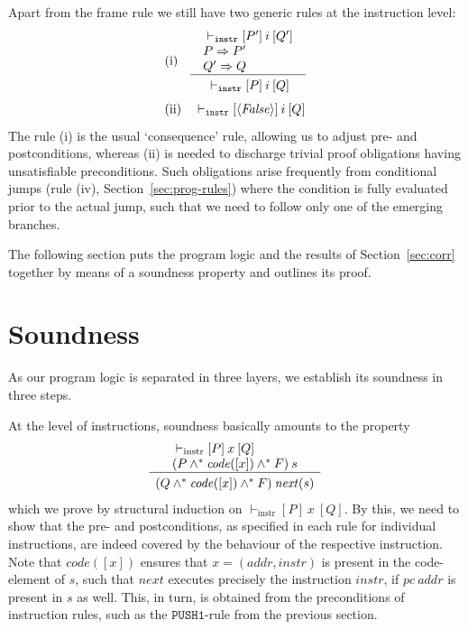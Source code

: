 \documentclass[sigplan,10pt]{acmart}\settopmatter{printfolios=true,printccs=false,printacmref=false}
\newcommand{\subpred}{\Rightarrow}
\newcommand{\sconj}{\wedge^*}
\newcommand{\ttrip}[5]{\mathit{#1} \vdash_{\mathrm{#2}}[#3]\:#4\:[#5]}
\newcommand{\xnext}{\mathit{next}}
\newcommand{\code}[1]{\mathit{code}(#1)}
\newcommand{\pc}{\mathit{pc}}
\newcommand{\instr}[1]{\mathtt{#1}}
\newcommand{\pure}[1]{\langle#1\rangle}
\newcommand{\RuleC}[2]{\begin{array}{c}#1\\\hline\noalign{\smallskip}#2\end{array}}
\begin{document}
Apart from the frame rule we still have two generic rules at the instruction level:
\[
\begin{array}{l l}
\mbox{(i)} & \RuleC{\begin{array}{l}
                     \ttrip{}{\mathtt{instr}}{P'}{i}{Q'} \\
                     P \subpred P' \\ 
                     Q' \subpred Q
                     \end{array}}{\ttrip{}{\mathtt{instr}}{P}{i}{Q}}
\end{array}
\]
\[
\begin{array}{l l}
\mbox{(ii)} & \ttrip{}{\mathtt{instr}}{\pure{\mathit{False}}}{i}{Q} 
\end{array}
\]
The rule (i) is the usual `consequence' rule, allowing us to adjust pre- and
postconditions, whereas (ii) is needed to discharge trivial 
proof obligations having unsatisfiable preconditions. Such obligations 
arise frequently from conditional jumps (rule (iv), Section~\ref{sec:prog-rules})
where the condition is fully evaluated prior to the actual jump, such that
we need to follow only one of the emerging branches.

The following section puts the program logic and the results of Section~\ref{sec:corr}
together by means of a soundness property and outlines its proof. 
%
\section{Soundness}
\label{sec:sound}
As our program logic is separated in three layers, we establish its soundness in three steps.

At the level of instructions, soundness basically amounts to the property
\begin{equation}
\label{prop:sound-instr}
\RuleC{\begin{array}{l}
         \ttrip{}{instr}{P}{x}{Q} \\
         (P \sconj \code{[x]} \sconj F)\: s
       \end{array}}
 {(Q \sconj \code{[x]} \sconj F)\: \xnext(s)}
\end{equation}
which we prove by structural induction on $\ttrip{}{instr}{P}{x}{Q}$. 
By this, we need to show that the pre- and postconditions, as specified in each 
rule for individual instructions, are indeed covered by the behaviour of 
the respective instruction. Note that $\code{[x]}$ ensures that 
$x = (\mathit{addr}, \mathit{instr})$ is present in the code-element of $s$, such that
$\xnext$ executes precisely the instruction $\mathit{instr}$, if $\pc\:\mathit{addr}$ is present in $s$ as well.
This, in turn, is obtained from the preconditions of instruction
rules, such as the $\instr{PUSH1}$-rule from the previous section.
\end{document}
